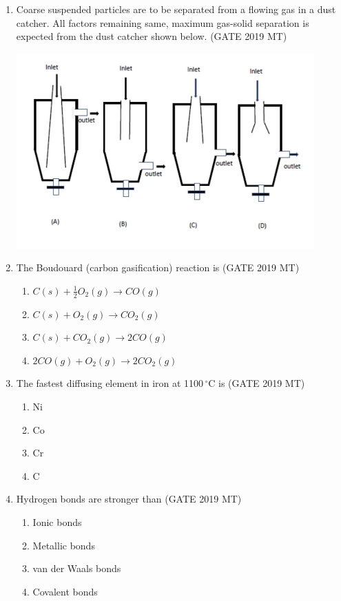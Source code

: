 \documentclass[12pt]{article}
\begin{document}
\begin{enumerate}
\item Coarse suspended particles are to be separated from a flowing gas in a dust catcher. All factors remaining same, maximum gas-solid separation is expected from the dust catcher shown below. (GATE 2019 MT)
\begin{center}
    \includegraphics[width=0.9\textwidth]{images/qq11oi.jpg}
\end{center}

\item The Boudouard (carbon gasification) reaction is \hspace{1em} (GATE 2019 MT)
\begin{enumerate}[label=(\alph*)]
    \item $C(s) + \frac{1}{2} O_2(g) \to CO(g)$
    \item $C(s) + O_2(g) \to CO_2(g)$
    \item $C(s) + CO_2(g) \to 2 CO(g)$
    \item $2 CO(g) + O_2(g) \to 2 CO_2(g)$
\end{enumerate}

\item The fastest diffusing element in iron at 1100$\, ^\circ$C is \hspace{1em} (GATE 2019 MT)
\begin{enumerate}[label=(\alph*)]
    \item Ni
    \item Co
    \item Cr
    \item C
\end{enumerate}

\item Hydrogen bonds are stronger than \hspace{1em} (GATE 2019 MT)
\begin{enumerate}[label=(\alph*)]
    \item Ionic bonds
    \item Metallic bonds
    \item van der Waals bonds
    \item Covalent bonds
\end{enumerate}


\end{enumerate}
\end{document}
